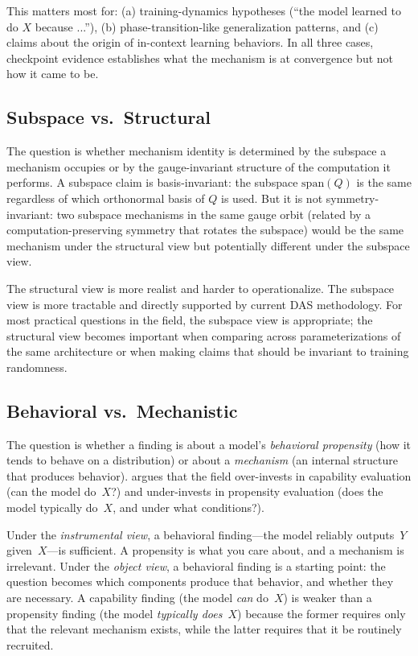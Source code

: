 \documentclass[11pt]{article}
\theoremstyle{remark}
\begin{document}
This matters most for: (a) training-dynamics hypotheses (``the model
learned to do $X$ because ...''), (b) phase-transition-like generalization
patterns, and (c) claims about the origin of in-context learning
behaviors.  In all three cases, checkpoint evidence establishes what
the mechanism is at convergence but not how it came to be.

\subsection{Subspace vs.\ Structural}

The question is whether mechanism identity is determined by the subspace
a mechanism occupies or by the gauge-invariant structure of the
computation it performs.  A subspace claim is basis-invariant: the
subspace $\mathrm{span}(Q)$ is the same regardless of which orthonormal
basis of $Q$ is used.  But it is not symmetry-invariant: two subspace
mechanisms in the same gauge orbit (related by a computation-preserving
symmetry that rotates the subspace) would be the same mechanism under
the structural view but potentially different under the subspace view.

The structural view is more realist and harder to operationalize.  The
subspace view is more tractable and directly supported by current DAS
methodology.  For most practical questions in the field, the subspace
view is appropriate; the structural view becomes important when
comparing across parameterizations of the same architecture or when
making claims that should be invariant to training randomness.

\subsection{Behavioral vs.\ Mechanistic}

The question is whether a finding is about a model's \emph{behavioral
propensity} (how it tends to behave on a distribution) or about a
\emph{mechanism} (an internal structure that produces behavior).
\citet{steinhardt2026} argues that the field over-invests in capability
evaluation (can the model do~$X$?) and under-invests in propensity
evaluation (does the model typically do~$X$, and under what conditions?).

Under the \emph{instrumental view}, a behavioral finding---the model
reliably outputs~$Y$ given~$X$---is sufficient.  A propensity is what
you care about, and a mechanism is irrelevant.  Under the \emph{object
view}, a behavioral finding is a starting point: the question becomes
which components produce that behavior, and whether they are
necessary.  A capability finding (the model \emph{can} do~$X$) is
weaker than a propensity finding (the model \emph{typically does}~$X$)
because the former requires only that the relevant mechanism exists,
while the latter requires that it be routinely recruited.
\end{document}
